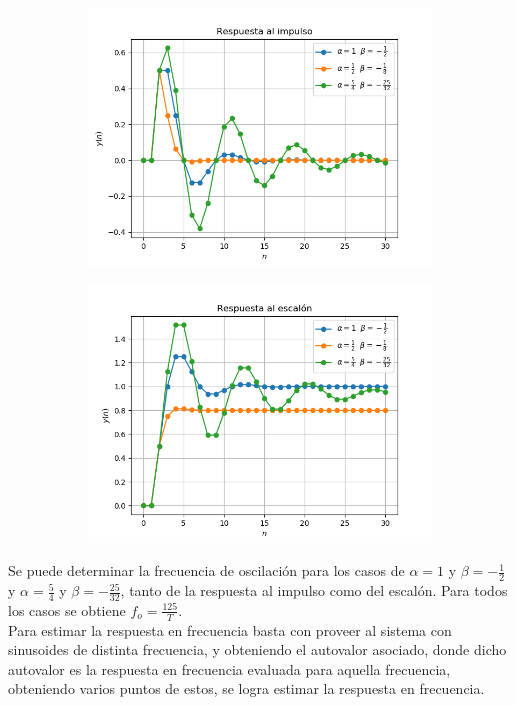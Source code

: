 \begin{figure}[H]
\centering
\begin{subfigure}{.49\textwidth}
\centering
	\includegraphics[width=\textwidth]{Imagenes/9-impulso.png}
\end{subfigure}
\begin{subfigure}{.49\textwidth}
\centering
	\includegraphics[width=\textwidth]{Imagenes/9-escalon.png}
\end{subfigure}
\end{figure}

Se puede determinar la frecuencia de oscilación para los casos de $\alpha = 1$ y $\beta = -\frac{1}{2}$ y $\alpha = \frac{5}{4}$ y $\beta = -\frac{25}{32}$, tanto de la respuesta al impulso como del escalón. Para todos los casos se obtiene $f_o = \frac{125}{T}$.\\
Para estimar la respuesta en frecuencia basta con proveer al sistema con sinusoides de  distinta frecuencia, y obteniendo el autovalor asociado, donde dicho autovalor es la respuesta en frecuencia evaluada para aquella frecuencia, obteniendo varios puntos de estos, se logra estimar la respuesta en frecuencia.

